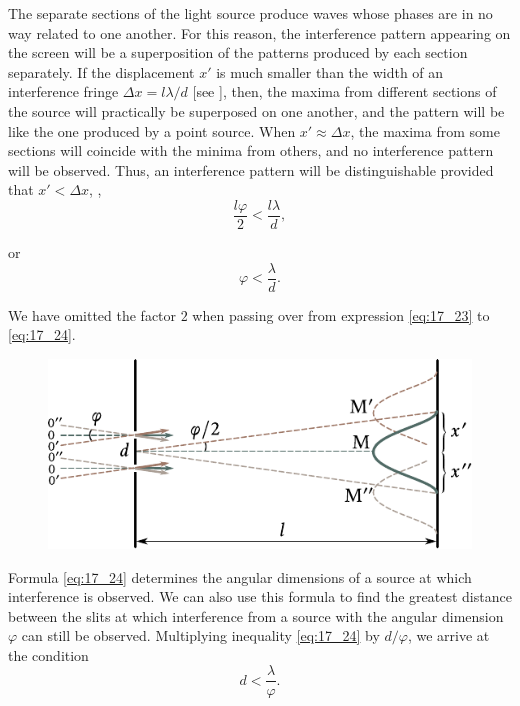 The separate sections of the light source produce waves whose phases are in no way related to one another.
For this reason, the interference pattern appearing on the screen will be a superposition of the patterns produced by each section separately.
If the displacement $x'$ is much smaller than the width of an interference fringe $\Delta{x}=l\lambda/d$ [see ], then, the maxima from different sections of the source will practically be superposed on one another, and the pattern will be like the one produced by a point source.
When $x'\approx\Delta{x}$, the maxima from some sections will coincide with the minima from others, and no interference pattern will be observed.
Thus, an interference pattern will be distinguishable provided that $x'<\Delta{x}$, \ie,
\begin{equation}\label{eq:17_23}
    \frac{l \varphi}{2} < \frac{l \lambda}{d},
\end{equation}

\noindent
or
\begin{equation}\label{eq:17_24}
    \varphi < \frac{\lambda}{d}.
\end{equation}

\noindent
We have omitted the factor $2$ when passing over from expression \eqref{eq:17_23} to \eqref{eq:17_24}.

\begin{figure}[!htb]
	\begin{center}
		\includegraphics[scale=1]{figures/ch_17/fig_17_7.pdf}
		\caption[]{}
		\label{fig:17_7}
	\end{center}
	\vspace{-0.9cm}
\end{figure}

Formula \eqref{eq:17_24} determines the angular dimensions of a source at which interference is observed.
We can also use this formula to find the greatest distance between the slits at which interference from a source with the angular dimension $\varphi$ can still be observed.
Multiplying inequality \eqref{eq:17_24} by $d/\varphi$, we arrive at the condition
\begin{equation}\label{eq:17_25}
    d < \frac{\lambda}{\varphi}.
\end{equation}

